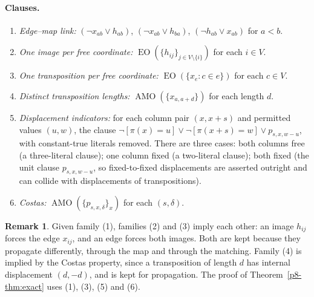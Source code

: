 \documentclass[11pt,a4paper,oneside]{report}
\theoremstyle{definition}
\newtheorem{remark}[theorem]{Remark}
\newcommand{\AMO}{\operatorname{AMO}}
\newcommand{\EO}{\operatorname{EO}}
\begin{document}
\paragraph{Clauses.}
\begin{enumerate}
\item \emph{Edge--map link:} $(\neg x_{ab}\vee h_{ab})$, $(\neg x_{ab}\vee h_{ba})$,
$(\neg h_{ab}\vee x_{ab})$ for $a<b$.
\item \emph{One image per free coordinate:} $\EO(\{h_{ij}\}_{j\in V\setminus\{i\}})$ for
each $i\in V$.
\item \emph{One transposition per free coordinate:} $\EO(\{x_e: c\in e\})$ for each $c\in V$.
\item \emph{Distinct transposition lengths:} $\AMO(\{x_{a,a+d}\})$ for each length $d$.
\item \emph{Displacement indicators:} for each column pair $(x,x+s)$ and permitted values
$(u,w)$, the clause $\neg[\pi(x)=u]\vee\neg[\pi(x+s)=w]\vee p_{s,x,w-u}$, with constant-true
literals removed. There are three cases: both columns free (a three-literal clause); one
column fixed (a two-literal clause); both fixed (the unit clause $p_{s,x,w-u}$, so
fixed-to-fixed displacements are asserted outright and can collide with displacements of
transpositions).
\item \emph{Costas:} $\AMO(\{p_{s,x,\delta}\}_x)$ for each $(s,\delta)$.
\end{enumerate}

\begin{remark}
Given family (1), families (2) and (3) imply each other: an image $h_{ij}$ forces the edge
$x_{ij}$, and an edge forces both images. Both are kept because they propagate differently,
through the map and through the matching. Family (4) is implied by the Costas property,
since a transposition of length $d$ has internal displacement $(d,-d)$, and is kept for
propagation. The proof of Theorem~\ref{p8-thm:exact} uses (1), (3), (5) and (6).
\end{remark}
\end{document}
